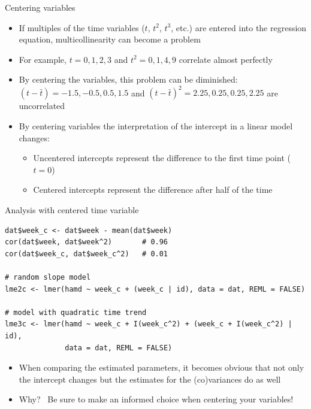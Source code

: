 \documentclass[aspectratio=169]{beamer}
\begin{document}
\begin{frame}{Centering variables}
  \begin{itemize}
    \item If multiples of the time variables ($t$, $t^2$, $t^3$, etc.) are
      entered into the regression equation, multicollinearity can become a
      problem
    \item For example, $t = 0, 1, 2, 3$ and $t^2 = 0, 1, 4, 9$ correlate almost
      perfectly
    \item By centering the variables, this problem can be diminished: $(t -
      \bar{t}) = -1.5, -0.5, 0.5,  1.5$ and $(t - \bar{t})^2 = 2.25, 0.25, 0.25,
      2.25$ are uncorrelated
    \item By centering variables the interpretation of the intercept in a linear
      model changes:
  \begin{itemize}
    \item Uncentered intercepts represent the difference to the first time 
    point ($t = 0$)
    \item Centered intercepts represent the difference after half of the 
    time
  \end{itemize}
  \end{itemize}
\end{frame}

\begin{frame}[fragile]{Analysis with centered time variable}
\begin{lstlisting}
dat$week_c <- dat$week - mean(dat$week)
cor(dat$week, dat$week^2)       # 0.96
cor(dat$week_c, dat$week_c^2)   # 0.01

# random slope model
lme2c <- lmer(hamd ~ week_c + (week_c | id), data = dat, REML = FALSE)

# model with quadratic time trend
lme3c <- lmer(hamd ~ week_c + I(week_c^2) + (week_c + I(week_c^2) | id),
              data = dat, REML = FALSE)
\end{lstlisting}
  \begin{itemize}
    \item When comparing the estimated parameters, it becomes obvious that not
      only the intercept changes but the estimates for the (co)variances do as
      well
    \item Why?\pause
      ~Be sure to make an informed choice when centering your
      variables!
  \end{itemize}
  \nocite{Alday2025}
\end{frame}
\end{document}
